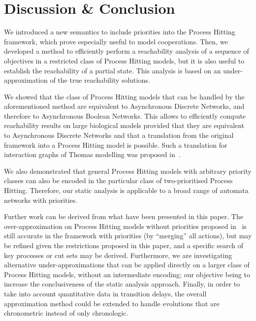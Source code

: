 \section{Discussion \& Conclusion}\label{sec:ccl}

We introduced a new semantics to include priorities into the Process Hitting framework, which prove especially useful to model cooperations.
Then, we developed a method to efficiently perform a reachability analysis of a sequence of objectives in a restricted class of Process Hitting models,
but it is also useful to establish the reachability of a partial state.
This analysis is based on an under-approximation of the true reachability solutions.

We showed that the class of Process Hitting models that can be handled by the aforementioned method are equivalent to Asynchronous Discrete Networks, and therefore to Asynchronous Boolean Networks.
This allows to efficiently compute reachability results on large biological models provided that they are equivalent to Asynchronous Discrete Networks and that a translation from the original framework into a Process Hitting model is possible.
Such a translation for interaction graphs of Thomas modelling was proposed in~\cite{PMR10-TCSB}. %

We also demonstrated that general Process Hitting models with arbitrary priority
classes can also be encoded in the particular class of two-prioritised Process Hitting.
Therefore, our static analysis is applicable to a broad range of automata
networks with priorities.

Further work can be derived from what have been presented in this paper.
The over-approximation on Process Hitting models without priorities proposed in~\cite{PMR12-MSCS}
is still accurate in the framework with priorities (by “merging” all actions),
but may be refined given the restrictions proposed in this paper,
and a specific search of key processes or cut sets may be derived.
Furthermore, we are investigating alternative under-approximations that can be
applied directly on a larger class of Process Hitting models, \ie without an
intermediate encoding; our objective being to increase the conclusiveness of the static
analysis approach.
Finally, in order to take into account quantitative data in transition delays, the overall approximation method could be extended to handle evolutions that are chronometric instead of only chronologic.

